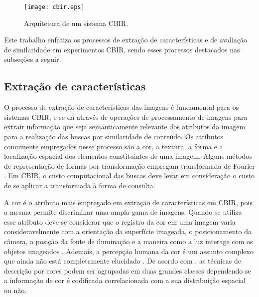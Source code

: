 \begin{figure} 
\centering
\caption{\label{fig:cbir} Arquitetura de um sistema \ac{CBIR}.}
\texttt{[image: cbir.eps]}
\end{figure}
 
Este trabalho enfatiza os processos de extração de características e de avaliação de similaridade em experimentos \ac{CBIR}, sendo esses processos destacados nas subseções a seguir.

\subsection{Extração de características}

O processo de extração de características das imagens é fundamental para os sistemas \ac{CBIR}, e se dá através de operações de processamento de imagens para extrair informação que seja semanticamente relevante dos atributos da imagem para a realização das buscas por similaridade de conteúdo. Os atributos comumente empregados nesse processo são a cor, a textura, a forma e a localização espacial dos elementos constituintes de uma imagem. Alguns métodos de representação de formas por transformação empregam transformada de Fourier \cite{Costa:1997,ShuPanWu2015}. Em \ac{CBIR}, o custo computacional das buscas deve levar em consideração o custo de se aplicar a transformada à forma de consulta. 

A cor é o atributo mais empregado em extração de características em \ac{CBIR}, pois a mesma permite discriminar uma ampla gama de imagens. Quando se utiliza esse atributo deve-se considerar que o registro da cor em uma imagem varia consideravelmente com a orientação da superfície imageada, o posicionamento da câmera, a posição da fonte de iluminação e a maneira como a luz interage com os objetos imageados \cite{Smeulders:2000}. Ademais, a percepção humana da cor é um assunto complexo que ainda não está completamente elucidado \cite{Smeulders:2000}. De acordo com , as técnicas de descrição por cores podem ser agrupadas em duas grandes classes dependendo se a informação de cor é codificada correlacionada com a sua distribuição espacial ou não. 

\begin{comment}Esses mesmos autores exemplificam como técnicas que não levam em consideração a distribuição espacial das cores os histogramas e os momentos de cores. 
\end{comment}

